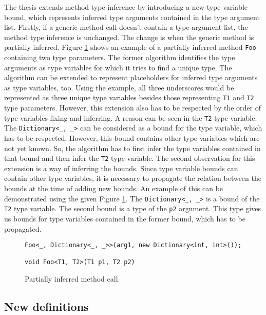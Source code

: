 The thesis extends method type inference by introducing a new type variable bound, which represents inferred type arguments contained in the type argument list. 
Firstly, if a generic method call doesn’t contain a type argument list, the method type inference is unchanged. The change is when the generic method is partially inferred. 
Figure \ref{img54:partInf} shows an example of a partially inferred method \texttt{Foo} containing two type parameters. 
The former algorithm identifies the type arguments as type variables for which it tries to find a unique type. 
The algorithm can be extended to represent placeholders for inferred type arguments as type variables, too. 
Using the example, all three underscores would be represented as three unique type variables besides those representing \texttt{T1} and \texttt{T2} type parameters. 
However, this extension also has to be respected by the order of type variables fixing and inferring. 
A reason can be seen in the \texttt{T2} type variable. 
The \texttt{Dictionary<\_, \_>} can be considered as a bound for the type variable, which has to be respected. 
However, this bound contains other type variables which are not yet known. 
So, the algorithm has to first infer the type variables contained in that bound and then infer the \texttt{T2} type variable. 
The second observation for this extension is a way of inferring the bounds. 
Since type variable bounds can contain other type variables, it is necessary to propagate the relation between the bounds at the time of adding new bounds. 
An example of this can be demonstrated using the given Figure \ref{img54:partInf}. 
The \texttt{Dictionary<\_, \_>} is a bound of the \texttt{T2} type variable. 
The second bound is a type of the \texttt{p2} argument. 
This type gives us bounds for type variables contained in the former bound, which has to be propagated.
\begin{figure}[h!]
\begin{lstlisting}[style=csharp]
Foo<_, Dictionary<_, _>>(arg1, new Dictionary<int, int>());

void Foo<T1, T2>(T1 p1, T2 p2)
\end{lstlisting}
\caption{Partially inferred method call.}
\label{img54:partInf}
\end{figure}

\subsection{New definitions}

